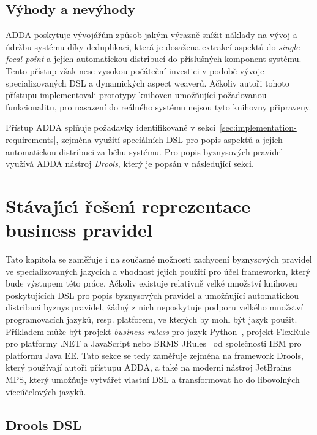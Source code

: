 \subsection{Výhody a nevýhody}

\gls{ADDA} poskytuje vývojářům způsob jakým výrazně snížit náklady na vývoj a údržbu
systému díky deduplikaci, která je dosažena extrakcí aspektů
do \textit{single focal point} a jejich automatickou distribucí do
příslušných komponent systému. Tento přístup však nese vysokou počáteční investici v
podobě vývoje specializovaných \gls{DSL} a dynamických aspect weaverů.
Ačkoliv autoři tohoto přístupu implementovali prototypy knihoven umožňující
požadovanou funkcionalitu, pro nasazení do reálného systému
nejsou tyto knihovny připraveny.

Přístup \gls{ADDA} splňuje požadavky identifikované v sekci~\ref{sec:implementation-requirements},
zejména využití speciálních \gls{DSL} pro popis aspektů a
jejich automatickou distribuci za běhu systému. Pro popis byznysových pravidel
využívá \gls{ADDA} nástroj \textit{Drools}, který je popsán v následující sekci.

\section{Stávaj\'{\i}c\'{\i} řešen\'{\i} reprezentace business pravidel}\label{sec:business-rule-dsl}

Tato kapitola se zaměřuje i na současné možnosti zachycení
byznysových pravidel ve specializovaných jazycích a vhodnost jejich použití
pro účel frameworku, který bude výstupem této práce.
Ačkoliv existuje relativně velké množství knihoven poskytujících
\gls{DSL} pro popis byznysových pravidel a umožňující automatickou
distribuci byznys pravidel, žádný z nich neposkytuje podporu velkého
množství programovacích jazyků, resp. platforem, ve kterých by mohl
být jazyk použit. Příkladem může být projekt \textit{business-ruless}
pro jazyk Python~\cite{businessrulespython}, projekt FlexRule pro platformy .NET a
JavaScript nebo \gls{BRMS} JRules~\cite{jrules} od společnosti IBM pro
platformu \gls{Java EE}.
Tato sekce se tedy zaměřuje zejména na framework Drools, který
používají autoři přístupu \gls{ADDA}, a také na moderní nástroj
JetBrains MPS, který umožňuje vytvářet vlastní \gls{DSL} a transformovat
ho do libovolných víceúčelových jazyků.

\subsection{Drools DSL}

